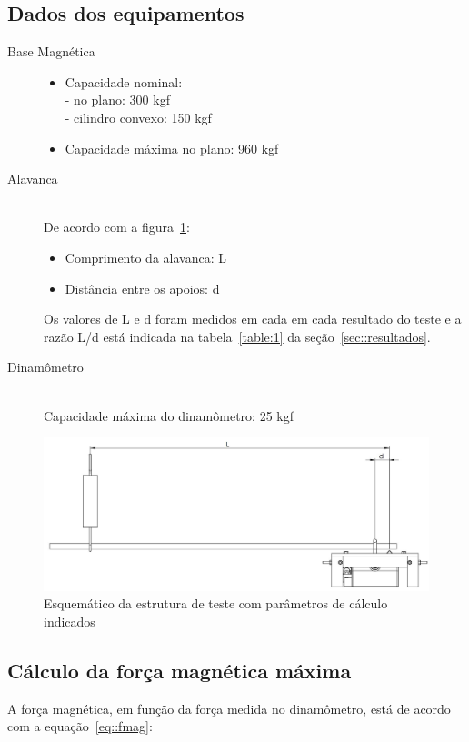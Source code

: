 \documentclass[12pt,a4paper]{article}
\begin{document}
\newpage
\subsection{Dados dos equipamentos}
\begin{description}
  \item[Base Magnética] \hfill
  \begin{itemize}
    \item Capacidade nominal: \\ [2ex]
	- no plano: 300 kgf \\
	- cilindro convexo: 150 kgf \\
	\item Capacidade máxima no plano: 960 kgf  
  \end{itemize}
  \item[Alavanca] \hfill \\
  De acordo com a figura~\ref{fig::esquematico}:
  \begin{itemize}
    \item Comprimento da alavanca: L
    \item Distância entre os apoios: d  	
  \end{itemize}
  Os valores de L e d foram medidos em cada em cada resultado do teste e a razão
  L/d está indicada na tabela~\ref{table:1} da seção~\ref{sec::resultados}.
  \item[Dinamômetro] \hfill \\
  Capacidade máxima do dinamômetro: 25 kgf
\end{description}

\begin{figure}[h]
\centering
	\includegraphics[width=0.9\columnwidth]{figs/esquematico.jpg}
	\caption{Esquemático da estrutura de teste com parâmetros de cálculo
	indicados}
	\label{fig::esquematico}
\end{figure}


\subsection{Cálculo da força magnética máxima}
A força magnética, em função da força medida no dinamômetro, está de acordo com
a equação~\ref{eq::fmag}:
\end{document}
